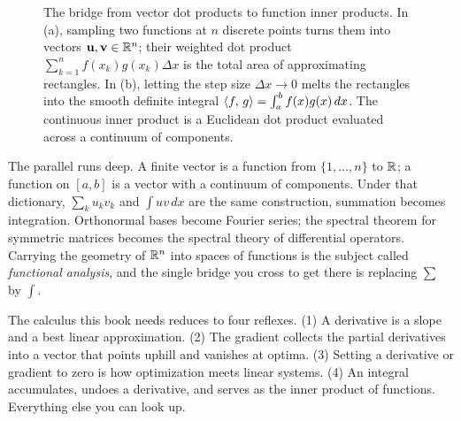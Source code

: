 \begin{figure}[H]
\caption{The bridge from vector dot products to function inner products. In (a), sampling two
functions at $n$ discrete points turns them into vectors $\mathbf{u}, \mathbf{v} \in \mathbb{R}^n$; their weighted
dot product $\sum_{k=1}^n f(x_k)g(x_k)\Delta x$ is the total area of approximating rectangles. In
(b), letting the step size $\Delta x \to 0$ melts the rectangles into the smooth definite integral
$\langle f,\, g \rangle = \int_a^b f(x)g(x)\,dx$. The continuous inner product is a Euclidean dot
product evaluated across a continuum of components.}
\label{ch39:fig-innerproduct}
\end{figure}

\begin{connectionbox}
The parallel runs deep. A finite vector is a function from $\{1,\dots,n\}$ to $\mathbb{R}$; a function on
$[a,b]$ is a vector with a continuum of components. Under that dictionary, $\sum_k u_k v_k$ and
$\int u v\,dx$ are the same construction, summation becomes integration. Orthonormal bases
become Fourier series; the spectral theorem for symmetric matrices becomes the spectral theory of
differential operators. Carrying the geometry of $\mathbb{R}^n$ into spaces of functions is the subject
called \emph{functional analysis}, and the single bridge you cross to get there is replacing $\sum$
by $\int$.
\end{connectionbox}

\begin{focusbox}
The calculus this book needs reduces to four reflexes. (1) A derivative is a slope and a best linear
approximation. (2) The gradient collects the partial derivatives into a vector that points uphill and
vanishes at optima. (3) Setting a derivative or gradient to zero is how optimization meets linear
systems. (4) An integral accumulates, undoes a derivative, and serves as the inner product of
functions. Everything else you can look up.
\end{focusbox}

